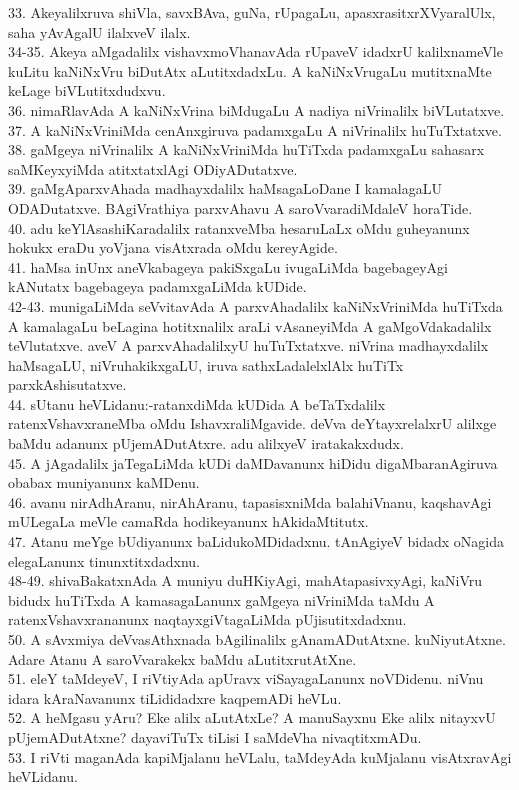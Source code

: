 \documentclass{article}
\begin{document}
33. Akeyalilxruva shiVla, savxBAva, guNa, rUpagaLu, apasxrasitxrXVyaralUlx, saha yAvAgalU ilalxveV ilalx.\\
34-35. Akeya aMgadalilx vishavxmoVhanavAda rUpaveV idadxrU kalilxnameVle kuLitu kaNiNxVru biDutAtx aLutitxdadxLu. A kaNiNxVrugaLu mutitxnaMte keLage biVLutitxdudxvu.\\
36. nimaRlavAda A kaNiNxVrina biMdugaLu A nadiya niVrinalilx biVLutatxve.\\
37. A kaNiNxVriniMda cenAnxgiruva padamxgaLu A niVrinalilx huTuTxtatxve.\\
38. gaMgeya niVrinalilx A kaNiNxVriniMda huTiTxda padamxgaLu sahasarx saMKeyxyiMda atitxtatxlAgi ODiyADutatxve.\\
39. gaMgAparxvAhada madhayxdalilx haMsagaLoDane I kamalagaLU ODADutatxve. BAgiVrathiya parxvAhavu A saroVvaradiMdaleV horaTide.\\
40. adu keYlAsashiKaradalilx ratanxveMba hesaruLaLx oMdu guheyanunx hokukx eraDu yoVjana visAtxrada oMdu kereyAgide.\\
41. haMsa inUnx aneVkabageya pakiSxgaLu ivugaLiMda bagebageyAgi kANutatx bagebageya padamxgaLiMda kUDide.\\
42-43. munigaLiMda seVvitavAda A parxvAhadalilx kaNiNxVriniMda huTiTxda A kamalagaLu beLagina hotitxnalilx araLi vAsaneyiMda A gaMgoVdakadalilx teVlutatxve. aveV A parxvAhadalilxyU huTuTxtatxve. niVrina madhayxdalilx haMsagaLU, niVruhakikxgaLU, iruva sathxLadalelxlAlx huTiTx parxkAshisutatxve.\\
44. sUtanu heVLidanu:-ratanxdiMda kUDida A beTaTxdalilx ratenxVshavxraneMba oMdu IshavxraliMgavide. deVva deYtayxrelalxrU alilxge baMdu adanunx pUjemADutAtxre. adu alilxyeV iratakakxdudx.\\
45. A jAgadalilx jaTegaLiMda kUDi daMDavanunx hiDidu digaMbaranAgiruva obabax muniyanunx kaMDenu.\\
46. avanu nirAdhAranu, nirAhAranu, tapasisxniMda balahiVnanu, kaqshavAgi mULegaLa meVle camaRda hodikeyanunx hAkidaMtitutx.\\
47. Atanu meYge bUdiyanunx baLidukoMDidadxnu. tAnAgiyeV bidadx oNagida elegaLanunx tinunxtitxdadxnu.\\
48-49. shivaBakatxnAda A muniyu duHKiyAgi, mahAtapasivxyAgi, kaNiVru bidudx huTiTxda A kamasagaLanunx gaMgeya niVriniMda taMdu A ratenxVshavxrananunx naqtayxgiVtagaLiMda pUjisutitxdadxnu.\\
50. A sAvxmiya deVvasAthxnada bAgilinalilx gAnamADutAtxne. kuNiyutAtxne. Adare Atanu A saroVvarakekx baMdu aLutitxrutAtXne.\\
51. eleY taMdeyeV, I riVtiyAda apUravx viSayagaLanunx noVDidenu. niVnu idara kAraNavanunx tiLididadxre kaqpemADi heVLu.\\
52. A heMgasu yAru? Eke alilx aLutAtxLe? A manuSayxnu Eke alilx nitayxvU pUjemADutAtxne? dayaviTuTx tiLisi I saMdeVha nivaqtitxmADu.\\
53. I riVti maganAda kapiMjalanu heVLalu, taMdeyAda kuMjalanu visAtxravAgi heVLidanu.
\end{document}
